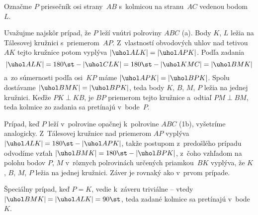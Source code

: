 {%
Označme $P$ priesečník osi strany~$AB$ s~kolmicou na stranu~$AC$ vedenou bodom~$L$.

Uvažujme najskôr prípad, že $P$ leží vnútri polroviny $ABC$ (\obr{}a). Body $K$, $L$ ležia na Tálesovej kružnici s~priemerom~$AP$. Z~vlastností obvodových uhlov nad tetivou~$AK$ tejto kružnice potom vyplýva $|\uhol ALK|=|\uhol APK|$. Podľa zadania
$$
|\uhol ALK|=180\st-|\uhol CLK|=180\st-|\uhol KMC|=|\uhol BMK|
$$
a~zo súmernosti podľa osi~$KP$ máme $|\uhol APK|=|\uhol BPK|$. Spolu dostávame $|\uhol BMK|=|\uhol BPK|$, teda body $K$, $B$, $M$, $P$ ležia na jednej kružnici. Keďže $PK\perp KB$, je $BP$ priemerom tejto kružnice a~odtiaľ $PM\perp BM$, teda kolmice zo zadania sa pretínajú v~bode~$P$.
%

Prípad, keď $P$ leží v~polrovine opačnej k~polrovine $ABC$ (\obrr1b), vyšetríme analogicky. Z~Tálesovej kružnice nad priemerom $AP$ vyplýva $|\uhol ALK|=180\st-|\uhol APK|$, takže postupom z~predošlého prípadu odvodíme vzťah $|\uhol BMK|=180\st-|\uhol BPK|$, z~čoho vzhľadom na polohu bodov $P$, $M$ v~rôznych polrovinách určených priamkou~$BK$ vyplýva, že $K$, $B$, $M$, $P$ ležia na jednej kružnici. Záver je rovnaký ako v~prvom prípade.

Špeciálny prípad, keď $P=K$, vedie k~záveru triviálne -- vtedy $|\uhol BMK|=|\uhol ALK|=90\st$, teda zadané kolmice sa pretínajú v~bode~$K$.
}

